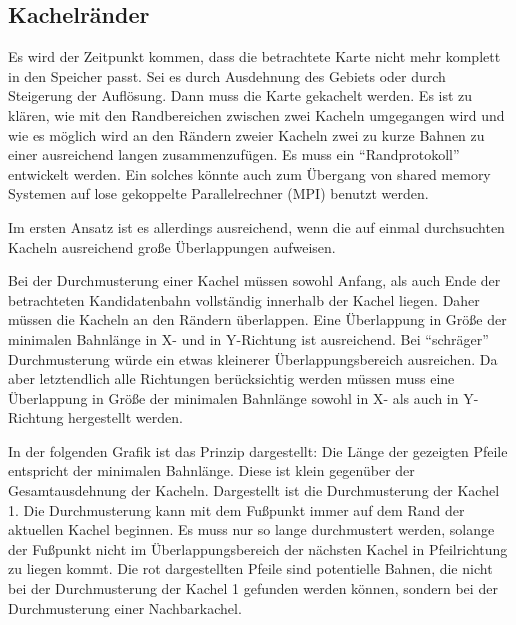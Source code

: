\documentclass[
11pt, %
a4paper, %
oneside, %
pdfspacing, %
headinclude,
BCOR5mm, %
ngerman, %
bibtotocnumbered,
]{scrartcl}
\begin{document}
\subsection{Kachelränder}
Es wird der Zeitpunkt kommen, dass die betrachtete Karte nicht mehr komplett in den Speicher passt. Sei es durch Ausdehnung des Gebiets oder durch Steigerung der Auflösung. Dann muss die Karte gekachelt werden. Es ist zu klären, wie mit den Randbereichen zwischen zwei Kacheln umgegangen wird und wie es möglich wird an den Rändern zweier Kacheln zwei zu kurze Bahnen zu einer ausreichend langen zusammenzufügen. Es muss ein "`Randprotokoll"' entwickelt werden. Ein solches könnte auch zum Übergang von shared memory Systemen auf lose gekoppelte Parallelrechner (MPI) benutzt werden.

Im ersten Ansatz ist es allerdings ausreichend, wenn die auf einmal durchsuchten Kacheln ausreichend große Überlappungen aufweisen.

Bei der Durchmusterung einer Kachel müssen sowohl Anfang, als auch Ende der betrachteten Kandidatenbahn vollständig innerhalb der Kachel liegen. Daher müssen die Kacheln an den Rändern überlappen. Eine Überlappung in Größe der minimalen Bahnlänge in X- und in Y-Richtung ist ausreichend. Bei "`schräger"' Durchmusterung würde ein etwas kleinerer Überlappungsbereich ausreichen. Da aber letztendlich alle Richtungen berücksichtig werden müssen muss eine Überlappung in Größe der minimalen Bahnlänge sowohl in X- als auch in Y-Richtung hergestellt werden.

In der folgenden Grafik ist das Prinzip dargestellt: Die Länge der gezeigten Pfeile entspricht der minimalen Bahnlänge. Diese ist klein gegenüber der Gesamtausdehnung der Kacheln. Dargestellt ist die Durchmusterung der Kachel 1. Die Durchmusterung kann mit dem Fußpunkt immer auf dem Rand der aktuellen Kachel beginnen. Es muss nur so lange durchmustert werden, solange der Fußpunkt nicht im Überlappungsbereich der nächsten Kachel in Pfeilrichtung zu liegen kommt. Die rot dargestellten Pfeile sind potentielle Bahnen, die nicht bei der Durchmusterung der Kachel 1 gefunden werden können, sondern bei der Durchmusterung einer Nachbarkachel.
\end{document}
